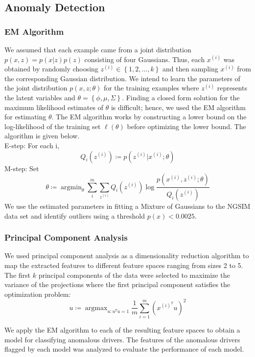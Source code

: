 \documentclass[10pt,journal]{IEEEtran}
\DeclareMathOperator*{\argmin}{argmin}
\DeclareMathOperator*{\argmax}{argmax}
\begin{document}
\subsection*{Anomaly Detection}
\subsubsection{EM Algorithm}
We assumed that each example came from a joint distribution $p(x,z)=p(x|z)p(z)$ consisting of four Gaussians. Thus, each $x^{(i)}$ was obtained by randomly choosing $z^{(i)}\in\left\{1,2,...,k\right\}$ and then sampling $x^{(i)}$ from the corresponding Gaussian distribution. We intend to learn the parameters of the joint distribution $p(x,z;\theta)$ for the training examples where $z^{(i)}$ represents the latent variables and $\theta=\left\{\phi,\mu,\Sigma\right\}$. Finding a closed form solution for the maximum likelihood estimates of $\theta$ is difficult; hence, we used the EM algorithm for estimating $\theta$. The EM algorithm works by constructing a lower bound on the log-likelihood of the training set $\ell(\theta)$ before optimizing the lower bound. The algorithm is given below.\\
\indent E-step: For each i,\\
$$\displaystyle Q_{i}(z^{(i)}) \coloneqq p(z^{(i)}|x^{(i)};\theta)$$
\indent M-step: Set \\
$$\displaystyle \theta \coloneqq \argmin_{\theta} {\sum_{i}^m\sum_{z^{(i)}} Q_{i}(z^{(i)})\log\dfrac{p(x^{(i)},z^{(i)};\theta)}{Q_{i}(z^{(i)})}}$$
We use the estimated parameters in fitting a Mixture of Gaussians to the NGSIM data set and identify outliers using a threshold $p(x)<0.0025$. 

\subsubsection{Principal Component Analysis}
We used principal component analysis as a dimensionality reduction algorithm to map the extracted features to different feature spaces ranging from sizes 2 to 5. The first $k$ principal components of the data were selected to maximize the variance of the projections where the first principal component satisfies the optimization problem:
$$\displaystyle u \coloneqq \argmax_{u:u^{T}u=1}{\dfrac{1}{m}\sum_{i=1}^{m}(x^{(i)^{T}}u)^{2}}$$

We apply the EM algorithm to each of the resulting feature spaces to obtain a model for classifying anomalous drivers. The features of the anomalous drivers flagged by each model was analyzed to evaluate the performance of each model.
\end{document}
